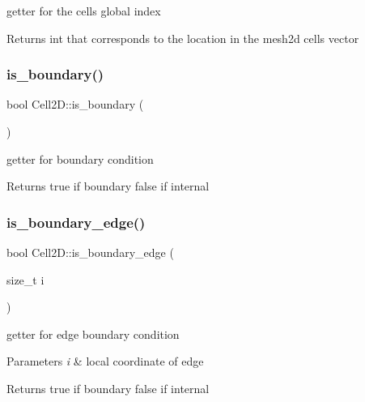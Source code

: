 getter for the cells global index 

\begin{DoxyReturn}{Returns}
int that corresponds to the location in the mesh2d cells vector 
\end{DoxyReturn}
\mbox{\label{classMeshFramework2D_1_1Cell2D_a4834404c5bfd4a4ee3f85118a5dc8bcd}} 
\subsubsection{\texorpdfstring{is\+\_\+boundary()}{is\_boundary()}}
{\footnotesize\ttfamily bool Cell2\+D\+::is\+\_\+boundary (\begin{DoxyParamCaption}{ }\end{DoxyParamCaption})}



getter for boundary condition 

\begin{DoxyReturn}{Returns}
true if boundary false if internal 
\end{DoxyReturn}
\mbox{\label{classMeshFramework2D_1_1Cell2D_aa0799aed687569c66741e8259d4858f6}} 
\subsubsection{\texorpdfstring{is\+\_\+boundary\+\_\+edge()}{is\_boundary\_edge()}}
{\footnotesize\ttfamily bool Cell2\+D\+::is\+\_\+boundary\+\_\+edge (\begin{DoxyParamCaption}\item[{size\+\_\+t}]{i }\end{DoxyParamCaption})}



getter for edge boundary condition 


\begin{DoxyParams}{Parameters}
{\em i} & local coordinate of edge\\
\hline
\end{DoxyParams}
\begin{DoxyReturn}{Returns}
true if boundary false if internal 
\end{DoxyReturn}
\mbox{\label{classMeshFramework2D_1_1Cell2D_a9374d59391f8e14f2840527baa67ab0a}} 
